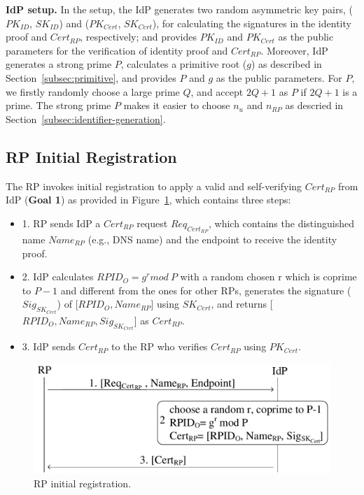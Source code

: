 \noindent\textbf{IdP setup.} In the setup, the IdP generates two random asymmetric key pairs, ($PK_{ID}$, $SK_{ID}$) and ($PK_{Cert}$, $SK_{Cert}$), for calculating the signatures in the identity proof and $Cert_{RP}$, respectively; and provides $PK_{ID}$ and $PK_{Cert}$ as the public parameters for the verification of identity proof and $Cert_{RP}$. Moreover, IdP generates a strong prime $P$, calculates  a primitive root ($g$) as described in Section~\ref{subsec:primitive}, and provides $P$ and $g$ as the public parameters. For $P$, we firstly randomly choose a large prime $Q$, and accept  $2Q+1$ as $P$ if $2Q+1$ is a prime. The strong prime $P$ makes it easier to choose $n_{u}$ and $n_{RP}$ as descried in Section~\ref{subsec:identifier-generation}. %

\subsection{RP Initial Registration}
\label{subsec:intialreg}
The RP invokes initial registration to apply a valid and self-verifying $Cert_{RP}$ from IdP (\textbf{Goal 1}) as provided in Figure~\ref{fig:registration}, which contains three steps:
\begin{itemize}
\item 1. RP sends IdP a $Cert_{RP}$ request $Req_{Cert_{RP}}$, which contains the distinguished name $Name_{RP}$ (e.g., DNS name) and the endpoint to receive the identity proof.
\item 2. IdP calculates $RPID_O = g^r mod \ P$ with a random chosen r which is coprime to $P-1$ and different from the ones for other RPs,  generates the signature ($Sig_{SK_{Cert}}$) of [$RPID_O, Name_{RP}$] using $SK_{Cert}$, and returns [$RPID_O, Name_{RP}, Sig_{SK_{Cert}}$] as $Cert_{RP}$.
\item 3. IdP sends $Cert_{RP}$ to the RP who verifies $Cert_{RP}$ using $PK_{Cert}$.
\end{itemize}

\begin{figure}
  \centering
  \includegraphics[width=\linewidth]{fig/registration.pdf}
  \caption{RP initial registration.}
  \label{fig:registration}
\end{figure}

